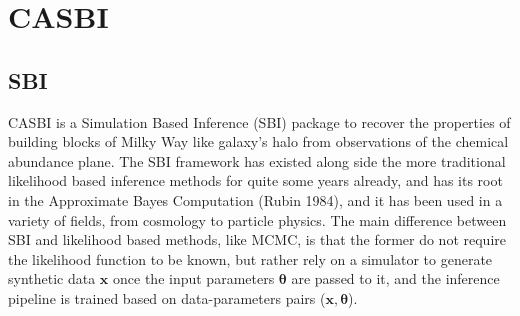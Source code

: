 \chapter{CASBI}

\section{SBI}
CASBI is a Simulation Based Inference (SBI) package to recover the properties of building blocks of Milky Way like galaxy's halo from observations of the chemical abundance plane. The SBI framework has existed along side the more traditional likelihood based inference methods for quite some years already, and has its root in the Approximate Bayes Computation (Rubin 1984), and it has been used in a variety of fields, from cosmology to particle physics. The main difference between SBI and likelihood based methods, like MCMC, is that the former do not require the likelihood function to be known, but rather rely on a simulator to generate synthetic data \textbf{$\mathbf{x}$} once the input parameters $\boldsymbol{\theta}$ are passed to it, and the inference pipeline is trained based on data-parameters pairs ($\mathbf{x}, \boldsymbol{\theta}$). 

